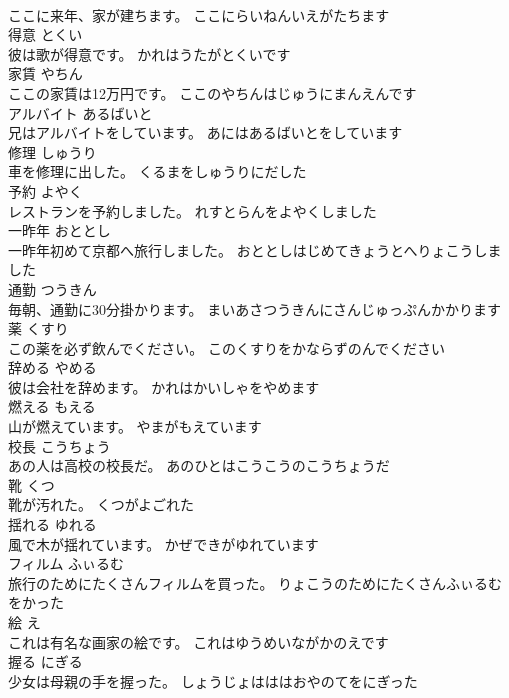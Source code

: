 \documentclass[8pt]{extreport}
\begin{document}
\begin{CJK}{UTF8}{min}
\\	ここに来年、家が建ちます。	ここにらいねんいえがたちます	
\\	得意	とくい	
\\	彼は歌が得意です。	かれはうたがとくいです	
\\	家賃	やちん	
\\	ここの家賃は12万円です。	ここのやちんはじゅうにまんえんです	
\\	アルバイト	あるばいと	
\\	兄はアルバイトをしています。	あにはあるばいとをしています	
\\	修理	しゅうり	
\\	車を修理に出した。	くるまをしゅうりにだした	
\\	予約	よやく	
\\	レストランを予約しました。	れすとらんをよやくしました	
\\	一昨年	おととし	
\\	一昨年初めて京都へ旅行しました。	おととしはじめてきょうとへりょこうしました	
\\	通勤	つうきん	
\\	毎朝、通勤に30分掛かります。	まいあさつうきんにさんじゅっぷんかかります	
\\	薬	くすり	
\\	この薬を必ず飲んでください。	このくすりをかならずのんでください	
\\	辞める	やめる	
\\	彼は会社を辞めます。	かれはかいしゃをやめます	
\\	燃える	もえる	
\\	山が燃えています。	やまがもえています	
\\	校長	こうちょう	
\\	あの人は高校の校長だ。	あのひとはこうこうのこうちょうだ	
\\	靴	くつ	
\\	靴が汚れた。	くつがよごれた	
\\	揺れる	ゆれる	
\\	風で木が揺れています。	かぜできがゆれています	
\\	フィルム	ふぃるむ	
\\	旅行のためにたくさんフィルムを買った。	りょこうのためにたくさんふぃるむをかった	
\\	絵	え	
\\	これは有名な画家の絵です。	これはゆうめいながかのえです	
\\	握る	にぎる	
\\	少女は母親の手を握った。	しょうじょはははおやのてをにぎった	

\end{CJK}
\end{document}
